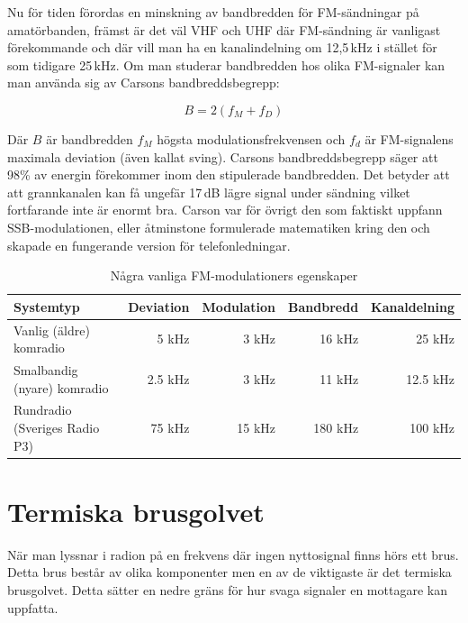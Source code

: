 Nu för tiden förordas en minskning av bandbredden för FM-sändningar på
amatörbanden, främst är det väl VHF och UHF där FM-sändning är vanligast
förekommande och där vill man ha en kanalindelning om 12,5\,kHz i stället för
som tidigare 25\,kHz. Om man studerar bandbredden hos olika FM-signaler kan
man använda sig av Carsons bandbreddsbegrepp:

\begin{equation}
	B=2(f_M+f_D)
\end{equation}

Där $B$ är bandbredden $f_M$ högsta modulationsfrekvensen och $f_d$ är
FM-signalens maximala deviation (även kallat sving). Carsons bandbreddsbegrepp
säger att 98\% av energin förekommer inom den stipulerade bandbredden. Det
betyder att att grannkanalen kan få ungefär 17\,dB lägre signal under sändning
vilket fortfarande inte är enormt bra. Carson var för övrigt den som faktiskt
uppfann SSB-modulationen, eller åtminstone formulerade matematiken kring den
och skapade en fungerande version för telefonledningar.

\begin{table}[H]
  \centering
  \begin{tabular}{lrrrr}
    \bf Systemtyp             & \bf Deviation & \bf Modulation & \bf Bandbredd & \bf Kanaldelning \\ \hline
Vanlig (äldre) komradio       & 5 kHz         & 3 kHz          & 16 kHz        & 25 kHz           \\
Smalbandig (nyare) komradio   & 2.5 kHz       & 3 kHz          & 11 kHz        & 12.5 kHz         \\
Rundradio (Sveriges Radio P3) & 75 kHz        & 15 kHz         & 180 kHz       & 100 kHz          \\
  \end{tabular}
  \caption{Några vanliga FM-modulationers egenskaper}
\end{table}

\section{Termiska brusgolvet}

När man lyssnar i radion på en frekvens där ingen nyttosignal finns hörs ett
brus. Detta brus består av olika komponenter men en av de viktigaste är det
termiska brusgolvet. Detta sätter en nedre gräns för hur svaga signaler en
mottagare kan uppfatta.

